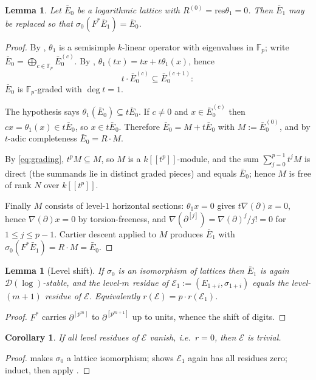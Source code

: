 \documentclass[11pt,reqno]{amsart}
\newcommand{\Fp}{\mathbb{F}_p}
\newcommand{\cD}{\mathcal{D}}
\newcommand{\cE}{\mathcal{E}}
\newcommand{\res}{\mathrm{res}}
\theoremstyle{plain}
\newtheorem{lemma}[theorem]{Lemma}
\newtheorem{corollary}[theorem]{Corollary}
\theoremstyle{definition}
\theoremstyle{remark}
\numberwithin{equation}{section}
\begin{document}
\begin{lemma}\label{lem:res0}
Let $\bar E_0$ be a logarithmic lattice with $R^{(0)}=\res\theta_1=0$.
Then $\bar E_1$ may be replaced so that $\sigma_0(F^*\bar E_1)=\bar E_0$.
\end{lemma}
\begin{proof}
By , $\theta_1$ is a semisimple $k$-linear operator
with eigenvalues in $\Fp$; write
$\bar E_0=\bigoplus_{c\in\Fp}\bar E_0^{(c)}$.  By ,
$\theta_1(tx)=tx+t\theta_1(x)$, hence
\begin{equation}\label{eq:grading}
   t\cdot\bar E_0^{(c)}\subseteq\bar E_0^{(c+1)} :
\end{equation}
$\bar E_0$ is $\Fp$-graded with $\deg t=1$.

The hypothesis says $\theta_1(\bar E_0)\subseteq t\bar E_0$.  If $c\ne0$
and $x\in\bar E_0^{(c)}$ then $cx=\theta_1(x)\in t\bar E_0$, so
$x\in t\bar E_0$.  Therefore $\bar E_0=M+t\bar E_0$ with
$M:=\bar E_0^{(0)}$, and by $t$-adic completeness $\bar E_0=R\cdot M$.

By \eqref{eq:grading}, $t^pM\subseteq M$, so $M$ is a $k[[t^p]]$-module,
and the sum $\sum_{j=0}^{p-1}t^jM$ is direct (the summands lie in distinct
graded pieces) and equals $\bar E_0$; hence $M$ is free of rank $N$ over
$k[[t^p]]$.

Finally $M$ consists of level-$1$ horizontal sections: $\theta_1x=0$ gives
$t\nabla(\partial)x=0$, hence $\nabla(\partial)x=0$ by torsion-freeness,
and $\nabla(\partial^{[j]})=\nabla(\partial)^j/j!=0$ for $1\le j\le p-1$.
Cartier descent applied to $M$ produces $\bar E_1$ with
$\sigma_0(F^*\bar E_1)=R\cdot M=\bar E_0$.
\end{proof}

\begin{lemma}[Level shift]\label{lem:shift}
If $\sigma_0$ is an isomorphism of lattices then $\bar E_1$ is again
$\cD(\log)$-stable, and the level-$m$ residue of
$\cE_1:=(E_{1+i},\sigma_{1+i})$ equals the level-$(m+1)$ residue of $\cE$.
Equivalently $r(\cE)=p\cdot r(\cE_1)$.
\end{lemma}
\begin{proof}
$F^*$ carries $\partial^{[p^m]}$ to $\partial^{[p^{m+1}]}$ up to units,
whence the shift of digits.
\end{proof}

\begin{corollary}\label{cor:allzero}
If all level residues of $\cE$ vanish, i.e.\ $r=0$, then $\cE$ is trivial.
\end{corollary}
\begin{proof}
 makes $\sigma_0$ a lattice isomorphism; 
shows $\cE_1$ again has all residues zero; induct, then apply
.
\end{proof}
\end{document}
